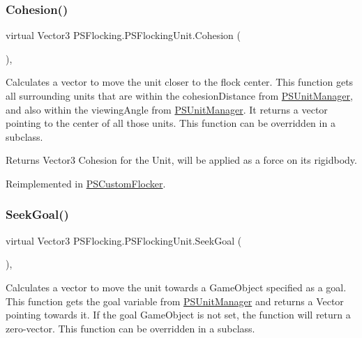 \subsubsection{\texorpdfstring{Cohesion()}{Cohesion()}}
{\footnotesize\ttfamily virtual Vector3 P\+S\+Flocking.\+P\+S\+Flocking\+Unit.\+Cohesion (\begin{DoxyParamCaption}{ }\end{DoxyParamCaption})\hspace{0.3cm}{\ttfamily [protected]}, {\ttfamily [virtual]}}



Calculates a vector to move the unit closer to the flock center. This function gets all surrounding units that are within the cohesion\+Distance from \hyperlink{class_p_s_flocking_1_1_p_s_unit_manager}{P\+S\+Unit\+Manager}, and also within the viewing\+Angle from \hyperlink{class_p_s_flocking_1_1_p_s_unit_manager}{P\+S\+Unit\+Manager}. It returns a vector pointing to the center of all those units. This function can be overridden in a subclass. 

\begin{DoxyReturn}{Returns}
Vector3 Cohesion for the Unit, will be applied as a force on its rigidbody. 
\end{DoxyReturn}


Reimplemented in \hyperlink{class_p_s_custom_flocker_a46d7ff69872c12983a666293794b976f}{P\+S\+Custom\+Flocker}.

\mbox{\label{class_p_s_flocking_1_1_p_s_flocking_unit_ab2ce12145c79e5e179f841412ed2febb}} 
\subsubsection{\texorpdfstring{Seek\+Goal()}{SeekGoal()}}
{\footnotesize\ttfamily virtual Vector3 P\+S\+Flocking.\+P\+S\+Flocking\+Unit.\+Seek\+Goal (\begin{DoxyParamCaption}{ }\end{DoxyParamCaption})\hspace{0.3cm}{\ttfamily [protected]}, {\ttfamily [virtual]}}



Calculates a vector to move the unit towards a Game\+Object specified as a goal. This function gets the goal variable from \hyperlink{class_p_s_flocking_1_1_p_s_unit_manager}{P\+S\+Unit\+Manager} and returns a Vector pointing towards it. If the goal Game\+Object is not set, the function will return a zero-\/vector. This function can be overridden in a subclass. 

